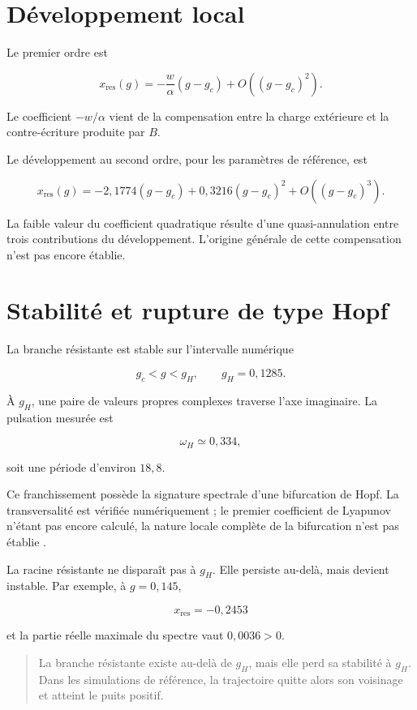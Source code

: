\section{Développement local}\label{t2-developpement-local}

Le premier ordre est

\[
x_{\mathrm{res}}(g)
=
-\frac{w}{\alpha}(g-g_c)
+
O((g-g_c)^2).
\]

Le coefficient \(-w/\alpha\) vient de la compensation entre la charge
extérieure et la contre-écriture produite par \(B\).

Le développement au second ordre, pour les paramètres de référence, est

\[
\boxed{
x_{\mathrm{res}}(g)
=
-2{,}1774(g-g_c)
+
0{,}3216(g-g_c)^2
+
O((g-g_c)^3)
}.
\]

La faible valeur du coefficient quadratique résulte d'une
quasi-annulation entre trois contributions du développement. L'origine
générale de cette compensation n'est pas encore établie.

\section{Stabilité et rupture de type Hopf}\label{t2-stabilite-et-rupture-par-hopf}

La branche résistante est stable sur l'intervalle numérique

\[
g_c<g<g_H,
\qquad
g_H=0{,}1285.
\]

À \(g_H\), une paire de valeurs propres complexes traverse l'axe
imaginaire. La pulsation mesurée est

\[
\omega_H\simeq0{,}334,
\]

soit une période d'environ \(18{,}8\).

Ce franchissement possède la signature spectrale d'une bifurcation de Hopf. La transversalité est vérifiée numériquement ; le premier coefficient de Lyapunov n'étant pas encore calculé, la nature locale complète de la bifurcation n'est pas établie \citep{kuznetsov2004elements}.

La racine résistante ne disparaît pas à \(g_H\). Elle persiste au-delà, mais devient instable. Par exemple, à \(g=0{,}145\),

\[
x_{\mathrm{res}}=-0{,}2453
\]

et la partie réelle maximale du spectre vaut \(0{,}0036>0\).

\begin{quote}
 La branche résistante existe au-delà de \(g_H\), mais elle perd sa stabilité à \(g_H\). Dans les simulations de référence, la trajectoire quitte alors son voisinage et atteint le puits positif.
\end{quote}

